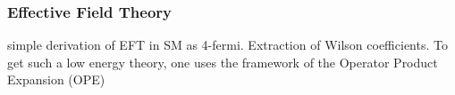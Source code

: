 \subsubsection{Effective Field Theory}
\label{sec_EFT}
\cite{BurasEFT} simple derivation of EFT in SM as 4-fermi. Extraction of Wilson coefficients.
To get such a
low energy theory, one uses the framework of the Operator Product Expansion (OPE)
